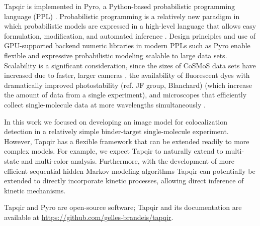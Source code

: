 Tapqir is implemented in Pyro, a Python-based probabilistic programming language (PPL) \cite{Bingham2019-qy}. Probabilistic programming is a relatively new paradigm in which probabilistic models are expressed in a high-level language that allows easy formulation, modification, and automated inference \cite{Van_de_Meent2018-mi}. Design principles and use of GPU-supported backend numeric libraries in modern PPLs such as Pyro enable flexible and expressive probabilistic modeling scalable to large data sets. Scalability is a significant consideration, since the sizes of CoSMoS data sets have increased due to faster, larger cameras \cite{Quan2011-cg}, the availability of fluorescent dyes with dramatically improved photostability \cite{Grimm2015-ea} (ref. JF group, Blanchard) (which increase the amount of data from a single experiment), and microscopes that efficiently collect single-molecule data at more wavelengths simultaneously \cite{Friedman2006-kb}.


In this work we focused on developing an image model for colocalization detection in a relatively simple binder-target single-molecule experiment. However, Tapqir has a flexible framework that can be extended readily to more complex models. For example, we expect Tapqir to naturally extend to multi-state and multi-color analysis. Furthermore, with the development of more efficient sequential hidden Markov modeling algorithms \cite{Sarkka2019-jw,Obermeyer2019-pp} Tapqir can potentially be extended to directly incorporate kinetic processes, allowing direct inference of kinetic mechanisms.

Tapqir and Pyro are open-source software; Tapqir and its documentation are available at \url{https://github.com/gelles-brandeis/tapqir}.


